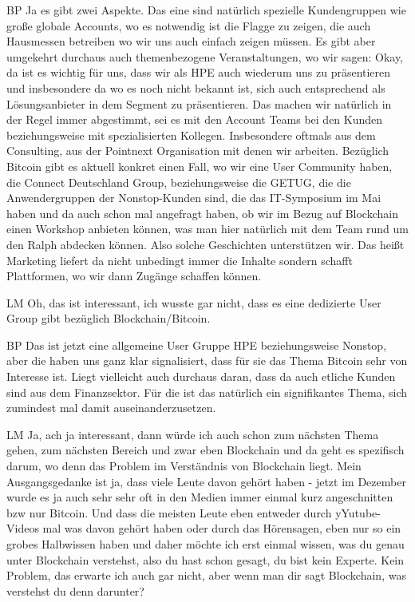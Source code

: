 \begin{xlist}
     \item[BP] Ja es gibt zwei Aspekte. Das eine sind natürlich spezielle Kundengruppen wie große globale Accounts, wo es notwendig ist die Flagge zu zeigen, die auch Hausmessen betreiben wo wir uns auch einfach zeigen müssen. Es gibt aber umgekehrt durchaus auch themenbezogene Veranstaltungen, wo wir sagen: Okay, da ist es wichtig für uns, dass wir als HPE auch wiederum uns zu präsentieren und insbesondere da wo es noch nicht bekannt ist, sich auch entsprechend als Lösungsanbieter in dem Segment zu präsentieren. Das machen wir natürlich in der Regel immer abgestimmt, sei es mit den Account Teams bei den Kunden beziehungsweise mit spezialisierten Kollegen. Insbesondere oftmals aus dem Consulting, aus der Pointnext Organisation mit denen wir arbeiten. Bezüglich Bitcoin gibt es aktuell konkret einen Fall, wo wir eine User Community haben, die Connect Deutschland Group, beziehungsweise die GETUG, die die Anwendergruppen der Nonstop-Kunden sind, die das IT-Symposium im Mai haben und da auch schon mal angefragt haben, ob wir im Bezug auf Blockchain einen Workshop anbieten können, was man hier natürlich mit dem Team rund um den Ralph abdecken können. Also solche Geschichten unterstützen wir. Das heißt Marketing liefert da nicht unbedingt immer die Inhalte sondern schafft Plattformen, wo wir dann Zugänge schaffen können. 
     \item[LM] Oh, das ist interessant, ich wusste gar nicht, dass es eine dedizierte User Group gibt bezüglich Blockchain/Bitcoin. 
     \item[BP]Das ist jetzt eine allgemeine User Gruppe HPE beziehungsweise Nonstop, aber die haben uns ganz klar signalisiert, dass für sie das Thema Bitcoin sehr von Interesse ist. Liegt vielleicht auch durchaus daran, dass da auch etliche Kunden sind aus dem Finanzsektor. Für die ist das natürlich ein signifikantes Thema, sich zumindest mal damit auseinanderzusetzen.
     \item[LM] Ja, ach ja interessant, dann würde ich auch schon zum nächsten Thema gehen, zum nächsten Bereich und zwar eben Blockchain und da geht es spezifisch darum, wo denn das Problem im Verständnis von Blockchain liegt. Mein Ausgangsgedanke ist ja, dass viele Leute davon gehört haben - jetzt im Dezember wurde es ja auch sehr sehr oft in den Medien immer einmal kurz angeschnitten bzw nur Bitcoin. Und dass die meisten Leute eben entweder durch yYutube-Videos mal was davon gehört haben oder durch das Hörensagen, eben nur so ein grobes Halbwissen haben und daher möchte ich erst einmal wissen, was du genau unter Blockchain verstehst, also du hast schon gesagt, du bist kein Experte. Kein Problem, das erwarte ich auch gar nicht, aber wenn man dir sagt Blockchain, was verstehst du denn darunter?

\end{xlist}
